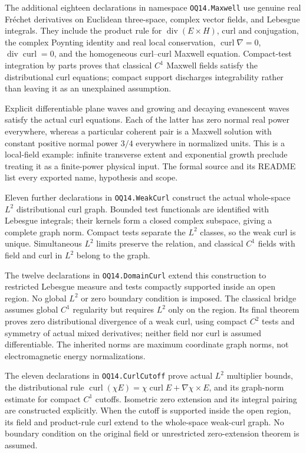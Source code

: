 The additional eighteen declarations in namespace \texttt{OQ14.Maxwell}
use genuine real Fr\'echet derivatives on Euclidean three-space,
complex vector fields, and Lebesgue integrals. They include the product
rule for $\operatorname{div}(E\times H)$, curl and conjugation,
the complex Poynting identity and real local conservation,
$\operatorname{curl}\nabla=0$, $\operatorname{div}\operatorname{curl}=0$,
and the homogeneous curl--curl Maxwell equation. Compact-test integration
by parts proves that classical $C^1$ Maxwell fields satisfy the
distributional curl equations; compact support discharges integrability
rather than leaving it as an unexplained assumption.

Explicit differentiable plane waves and growing and decaying evanescent
waves satisfy the actual curl equations. Each of the latter has zero
normal real power everywhere, whereas a particular coherent pair is a
Maxwell solution with constant positive normal power $3/4$ everywhere
in normalized units. This is a local-field example: infinite transverse
extent and exponential growth preclude treating it as a finite-power
physical input. The formal source and its README list every exported
name, hypothesis and scope.

Eleven further declarations in \texttt{OQ14.WeakCurl} construct the
actual whole-space $L^2$ distributional curl graph. Bounded test
functionals are identified with Lebesgue integrals; their kernels form
a closed complex subspace, giving a complete graph norm. Compact tests
separate the $L^2$ classes, so the weak curl is unique. Simultaneous
$L^2$ limits preserve the relation, and classical $C^1$ fields with
field and curl in $L^2$ belong to the graph.

The twelve declarations in \texttt{OQ14.DomainCurl} extend this
construction to restricted Lebesgue measure and tests compactly
supported inside an open region. No global $L^2$ or zero boundary
condition is imposed. The classical bridge assumes global $C^1$
regularity but requires $L^2$ only on the region. Its final theorem
proves zero distributional divergence of a weak curl, using compact
$C^2$ tests and symmetry of actual mixed derivatives; neither field
nor curl is assumed differentiable. The inherited norms are maximum
coordinate graph norms, not electromagnetic energy normalizations.

The eleven declarations in \texttt{OQ14.CurlCutoff} prove actual
$L^2$ multiplier bounds, the distributional rule
$\operatorname{curl}(\chi E)=\chi\operatorname{curl}E+
\nabla\chi\times E$, and its graph-norm estimate for compact $C^1$
cutoffs. Isometric zero extension and its integral pairing are
constructed explicitly. When the cutoff is supported inside the open
region, its field and product-rule curl extend to the whole-space
weak-curl graph. No boundary condition on the original field or
unrestricted zero-extension theorem is assumed.

